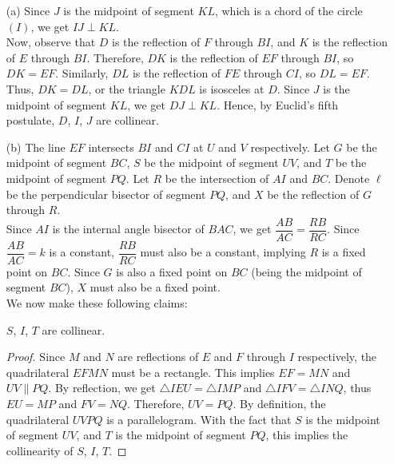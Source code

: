 \documentclass[11pt]{article}
\begin{document}
        \begin{solution}
            \hfill
            \begin{enumerate}
                \item[(a)] Since \(J\) is the midpoint of segment \(KL\), which is a chord of the circle \((I)\), we get \(IJ \perp KL\).\\
                Now, observe that \(D\) is the reflection of \(F\) through \(BI\), and \(K\) is the reflection of \(E\) through \(BI\). Therefore, \(DK\) is the reflection of \(EF\) through \(BI\), so \(DK = EF\). Similarly, \(DL\) is the reflection of \(FE\) through \(CI\), so \(DL = EF\). Thus, \(DK = DL\), or the triangle \(KDL\) is isosceles at \(D\). Since \(J\) is the midpoint of segment \(KL\), we get \(DJ \perp KL\). Hence, by Euclid's fifth postulate, \(D\), \(I\), \(J\) are collinear.
                
                \item[(b)] The line \(EF\) intersects \(BI\) and \(CI\) at \(U\) and \(V\) respectively. Let \(G\) be the midpoint of segment \(BC\), \(S\) be the midpoint of segment \(UV\), and \(T\) be the midpoint of segment \(PQ\). Let \(R\) be the intersection of \(AI\) and \(BC\). Denote \(\ell\) be the perpendicular bisector of segment \(PQ\), and \(X\) be the reflection of \(G\) through \(R\).\\
                Since \(AI\) is the internal angle bisector of \(BAC\), we get \(\dfrac{AB}{AC} = \dfrac{RB}{RC}\). Since \(\dfrac{AB}{AC} = k\) is a constant, \(\dfrac{RB}{RC}\) must also be a constant, implying \(R\) is a fixed point on \(BC\). Since \(G\) is also a fixed point on \(BC\) (being the midpoint of segment \(BC\)), \(X\) must also be a fixed point.\\
                We now make these following claims:

                \begin{claim}
                    \(S\), \(I\), \(T\) are collinear.
                \end{claim}

                \begin{proof}
                    Since \(M\) and \(N\) are reflections of \(E\) and \(F\) through \(I\) respectively, the quadrilateral \(EFMN\) must be a rectangle. This implies \(EF = MN\) and \(UV \parallel PQ\). By reflection, we get \(\triangle IEU = \triangle IMP\) and \(\triangle IFV = \triangle INQ\), thus \(EU = MP\) and \(FV = NQ\). Therefore, \(UV = PQ\). By definition, the quadrilateral \(UVPQ\) is a parallelogram. With the fact that \(S\) is the midpoint of segment \(UV\), and \(T\) is the midpoint of segment \(PQ\), this implies the collinearity of \(S\), \(I\), \(T\).
                \end{proof}
                

\end{enumerate}
\end{solution}
\end{document}

